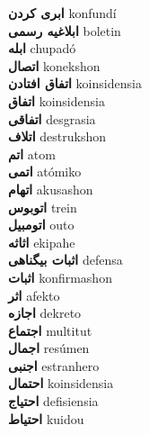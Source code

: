 \textbf{ ابری کردن  } konfundí \\
\textbf{ ابلاغیه رسمی  } boletin \\
\textbf{ ابله  } chupadó \\
\textbf{ اتصال  } konekshon \\
\textbf{ اتفاق افتادن  } koinsidensia \\
\textbf{ اتفاق  } koinsidensia \\
\textbf{ اتفاقی  } desgrasia \\
\textbf{ اتلاف  } destrukshon \\
\textbf{ اتم  } atom \\
\textbf{ اتمی  } atómiko \\
\textbf{ اتهام  } akusashon \\
\textbf{ اتوبوس  } trein \\
\textbf{ اتومبیل  } outo \\
\textbf{ اثاثه  } ekipahe \\
\textbf{ اثبات بیگناهی  } defensa \\
\textbf{ اثبات  } konfirmashon \\
\textbf{ اثر  } afekto \\
\textbf{ اجازه  } dekreto \\
\textbf{ اجتماع  } multitut \\
\textbf{ اجمال  } resúmen \\
\textbf{ اجنبی  } estranhero \\
\textbf{ احتمال  } koinsidensia \\
\textbf{ احتیاج  } defisiensia \\
\textbf{ احتیاط  } kuidou \\
